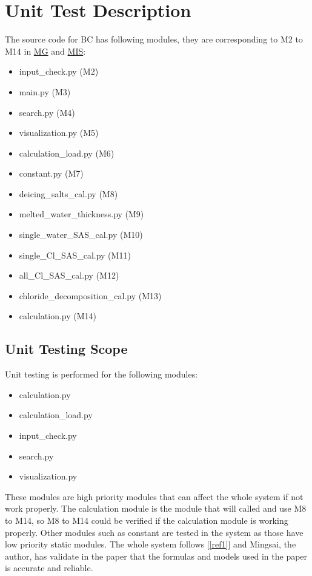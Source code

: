 \documentclass[12pt, titlepage]{article}
\newcommand{\reref}[1]{\ref{#1}}
\begin{document}

\section{Unit Test Description}\label{UTD}
The source code for BC has following modules, they are corresponding to M2 to M14 in \href{https://github.com/CynthiaLiu0805/BridgeCorrosion/blob/main/docs/Design/SoftArchitecture/MG.pdf}{MG} and \href{https://github.com/CynthiaLiu0805/BridgeCorrosion/blob/main/docs/Design/SoftDetailedDes/MIS.pdf}{MIS}:
\begin{itemize}
\item input\_check.py (M2)
\item main.py (M3)
\item search.py (M4)
\item visualization.py (M5)
\item calculation\_load.py (M6)
\item constant.py (M7)
\item deicing\_salts\_cal.py (M8)
\item melted\_water\_thickness.py (M9)
\item single\_water\_SAS\_cal.py (M10)
\item single\_Cl\_SAS\_cal.py (M11)
\item all\_Cl\_SAS\_cal.py (M12)
\item chloride\_decomposition\_cal.py (M13)
\item calculation.py (M14)
\end{itemize}

\subsection{Unit Testing Scope}
Unit testing is performed for the following modules:
\begin{itemize}
\item calculation.py
\item calculation\_load.py
\item input\_check.py
\item search.py
\item visualization.py
\end{itemize}

These modules are high priority modules that can affect the whole system if not work properly. The calculation module is the module that will called and use M8 to M14, so M8 to M14 could be verified if the calculation module is working properly. Other modules such as constant are tested in the system as those
have low priority static modules.
The whole system follows [\reref{ref1}] and Mingsai, the author, has validate in the paper that the formulas and models used in the paper is accurate and reliable. 
\end{document}
